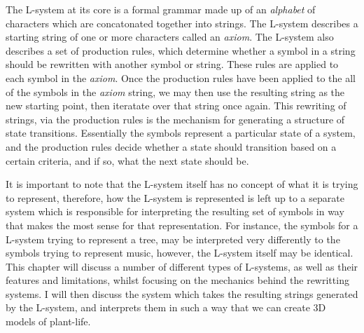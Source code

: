 \begin{flushleft}

The L-system at its core is a formal grammar made up of an \textit{alphabet} of characters which are concatonated together into strings. The L-system describes a starting string of one or more characters called an \textit{axiom}. The L-system also describes a set of production rules, which determine whether a symbol in a string should be rewritten with another symbol or string. These rules are applied to each symbol in the \textit{axiom}. Once the production rules have been applied to the all of the symbols in the \textit{axiom} string, we may then use the resulting string as the new starting point, then iteratate over that string once again. This rewriting of strings, via the production rules is the mechanism for generating a structure of state transitions. Essentially the symbols represent a particular state of a system, and the production rules decide whether a state should transition based on a certain criteria, and if so, what the next state should be. \\

\vspace{5mm}

It is important to note that the L-system itself has no concept of what it is trying to represent, therefore, how the L-system is represented is left up to a separate system which is responsible for interpreting the resulting set of symbols in way that makes the most sense for that representation. For instance, the symbols for a L-system trying to represent a tree, may be interpreted very differently to the symbols trying to represent music, however, the L-system itself may be identical. \\
This chapter will discuss a number of different types of L-systems, as well as their features and limitations, whilst focusing on the mechanics behind the rewritting systems. I will then discuss the system which takes the resulting strings generated by the L-system, and interprets them in such a way that we can create 3D models of plant-life. \\

\vspace{5mm} 


\end{flushleft}
